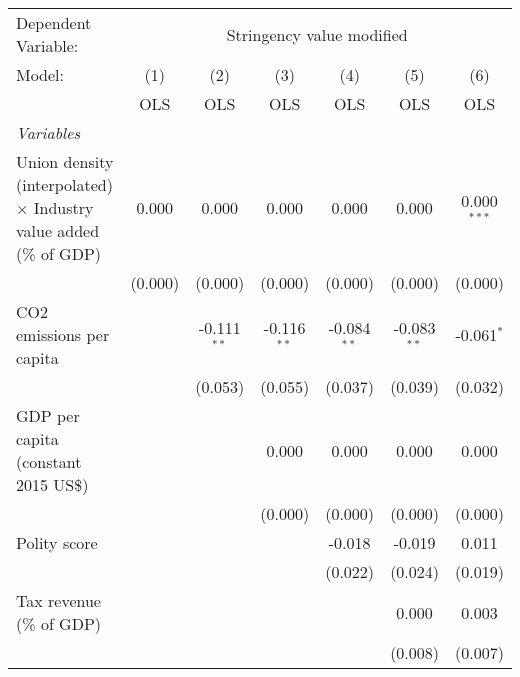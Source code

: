 
\begingroup
\centering
\begin{tabular}{lcccccc}
   \toprule
   Dependent Variable: & \multicolumn{6}{c}{Stringency value modified}\\
   Model:                                                                   & (1)     & (2)           & (3)           & (4)           & (5)           & (6)\\  
                                                                            &  OLS    & OLS           & OLS           & OLS           & OLS           & OLS\\  
   \midrule
   \emph{Variables}\\
   Union density (interpolated) $\times$ Industry value added (\% of GDP)   & 0.000   & 0.000         & 0.000         & 0.000         & 0.000         & 0.000$^{***}$\\   
                                                                            & (0.000) & (0.000)       & (0.000)       & (0.000)       & (0.000)       & (0.000)\\   
   CO2 emissions per capita                                                 &         & -0.111$^{**}$ & -0.116$^{**}$ & -0.084$^{**}$ & -0.083$^{**}$ & -0.061$^{*}$\\   
                                                                            &         & (0.053)       & (0.055)       & (0.037)       & (0.039)       & (0.032)\\   
   GDP per capita (constant 2015 US\$)                                      &         &               & 0.000         & 0.000         & 0.000         & 0.000\\   
                                                                            &         &               & (0.000)       & (0.000)       & (0.000)       & (0.000)\\   
   Polity score                                                             &         &               &               & -0.018        & -0.019        & 0.011\\   
                                                                            &         &               &               & (0.022)       & (0.024)       & (0.019)\\   
   Tax revenue (\% of GDP)                                                  &         &               &               &               & 0.000         & 0.003\\   
                                                                            &         &               &               &               & (0.008)       & (0.007)\\   

\end{tabular}
